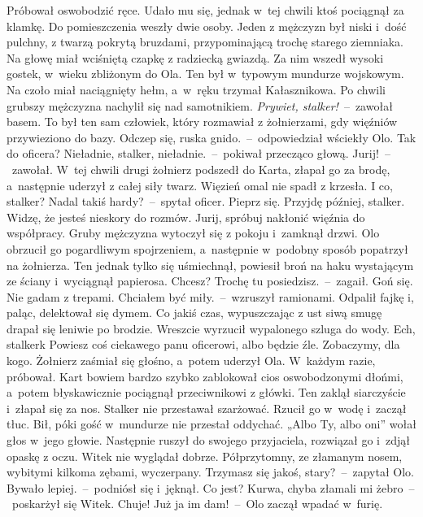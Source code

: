 \documentclass[../MAIN.tex]{subfiles}
\begin{document}
Próbował oswobodzić ręce. Udało mu się, jednak w~tej chwili ktoś pociągnął za klamkę. Do pomieszczenia weszły dwie osoby. Jeden z mężczyzn był niski i~dość pulchny, z twarzą pokrytą bruzdami, przypominającą trochę starego ziemniaka. Na głowę miał wciśniętą czapkę z radziecką gwiazdą. Za nim wszedł wysoki gostek, w~wieku zbliżonym do Ola. Ten był w~typowym mundurze wojskowym. Na czoło miał naciągnięty hełm, a~w~ręku trzymał Kałasznikowa. Po chwili grubszy mężczyzna nachylił się nad samotnikiem.
\sd
\xx \textit{Prywiet, stalker!}~--~zawołał basem. To był ten sam człowiek, który rozmawiał z żołnierzami, gdy więźniów przywieziono do bazy.
\xx Odczep się, ruska gnido.~--~odpowiedział wściekły Olo.
\xx Tak do oficera? Nieładnie, stalker, nieładnie.~--~pokiwał przecząco głową.
\xx Jurij!~--~zawołał.
\qm
 W~tej chwili drugi żołnierz podszedł do Karta, złapał go za brodę, a~następnie uderzył z całej siły twarz. Więzień omal nie spadł z krzesła.
\sd
\xx I co, stalker? Nadal takiś hardy?~--~spytał oficer.
\xx Pieprz się.
\xx Przyjdę później, stalker. Widzę, że jesteś nieskory do rozmów. Jurij, spróbuj nakłonić więźnia do współpracy.
\qm
 Gruby mężczyzna wytoczył się z pokoju i~zamknął drzwi. Olo obrzucił go pogardliwym spojrzeniem, a~następnie w~podobny sposób popatrzył na żołnierza. Ten jednak tylko się uśmiechnął, powiesił broń na haku wystającym ze ściany i~wyciągnął papierosa.
\sd
\xx Chcesz? Trochę tu posiedzisz.~--~zagaił.
\xx Goń się. Nie gadam z trepami.
\xx Chciałem być miły.~--~wzruszył ramionami.
\qm
 Odpalił fajkę i, paląc, delektował się dymem. Co jakiś czas, wypuszczając z ust siwą smugę drapał się leniwie po brodzie. Wreszcie wyrzucił wypalonego szluga do wody.
\sd
\xx Ech, stalker\3k Powiesz coś ciekawego panu oficerowi, albo będzie źle.
\xx Zobaczymy, dla kogo.
\qm
Żołnierz zaśmiał się głośno, a~potem uderzył Ola. W~każdym razie, próbował. Kart bowiem bardzo szybko zablokował cios oswobodzonymi dłońmi, a~potem błyskawicznie pociągnął przeciwnikowi z główki. Ten zaklął siarczyście i~złapał się za nos. Stalker nie przestawał szarżować. Rzucił go w~wodę i~zaczął tłuc. Bił, póki gość w~mundurze nie przestał oddychać. „Albo Ty, albo oni” wołał głos w~jego głowie. Następnie ruszył do swojego przyjaciela, rozwiązał go i~zdjął opaskę z oczu. Witek nie wyglądał dobrze. Półprzytomny, ze złamanym nosem, wybitymi kilkoma zębami, wyczerpany.
\sd
\xx Trzymasz się jakoś, stary?~--~zapytał Olo.
\xx Bywało lepiej.~--~podniósł się i~jęknął.
\xx Co jest?
\xx Kurwa, chyba złamali mi żebro~--~poskarżył się Witek.
\xx Chuje! Już ja im dam!~--~Olo zaczął wpadać w~furię.
\end{document}
